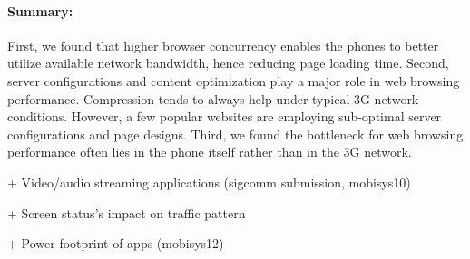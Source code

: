 
\paragraph{Summary:} First, we found that higher browser concurrency 
enables the phones to better utilize available network bandwidth, 
hence reducing page loading time. Second, server configurations and 
content optimization play a major role in web browsing performance. 
Compression tends to always help under typical 3G network conditions. 
However, a few popular websites are employing sub-optimal server 
configurations and page designs. Third, we found the bottleneck 
for web browsing performance often lies in the phone itself
rather than in the 3G network.


	
	
	
	
	
	
	

	+ Video/audio streaming applications (sigcomm submission, mobisys10)
%
%
%



	+ Screen status's impact on traffic pattern

	+ Power footprint of apps (mobisys12)
	
	
